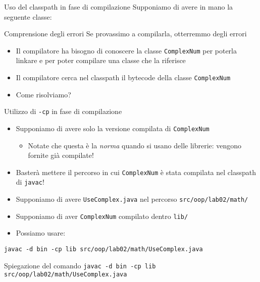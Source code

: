 \documentclass[presentation]{beamer}
\begin{document}
\begin{frame}{Uso del classpath in fase di compilazione}
   Supponiamo di avere in mano la seguente classe:
    \begin{block}{Comprensione degli errori}
        Se provassimo a compilarla, otterremmo degli errori
        \begin{itemize}
		\item Il compilatore ha bisogno di conoscere la classe \texttt{ComplexNum} per poterla 
linkare e per poter compilare una classe che la riferisce
		\item Il compilatore cerca nel classpath il bytecode della classe \texttt{ComplexNum}
		\item Come risolviamo?
        \end{itemize}
    \end{block}
    \begin{block}{Utilizzo di \texttt{-cp} in fase di compilazione}
        \begin{itemize}
            \item Supponiamo di avere solo la versione compilata di \texttt{ComplexNum}
            \begin{itemize}
                \item Notate che questa è la \textit{norma} quando si usano delle librerie: vengono 
                fornite già compilate!
            \end{itemize}
            \item Basterà mettere il percorso in cui \texttt{ComplexNum} è stata compilata nel 
            classpath di \texttt{javac}!
            \item Supponiamo di avere \texttt{UseComplex.java} nel percorso 
            \texttt{src/oop/lab02/math/}
            \item Supponiamo di aver \texttt{ComplexNum} compilato dentro \texttt{lib/}
            \item Possiamo usare:
        \end{itemize}
        \alert{\texttt{javac -d bin -cp lib src/oop/lab02/math/UseComplex.java}}
    \end{block}
    \begin{block}{Spiegazione del comando}
        \texttt{javac -d bin -cp lib src/oop/lab02/math/UseComplex.java}
        \begin{itemize}

\end{itemize}
\end{block}
\end{frame}
\end{document}
